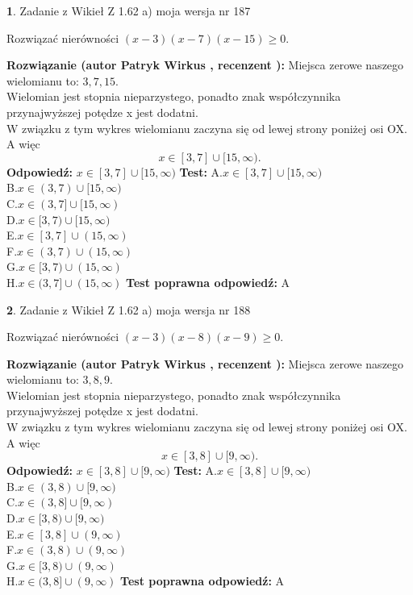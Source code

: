\documentclass[12pt, a4paper]{article}
\theoremstyle{definition} %
\newtheorem{zad}{}
\newcommand{\zadStart}[1]{\begin{zad}#1\newline}
\newcommand{\zadStop}{\end{zad}}
\newcommand{\rozwStart}[2]{\noindent \textbf{Rozwiązanie (autor #1 , recenzent #2): }\newline}
\newcommand{\rozwStop}{\newline}
\newcommand{\odpStart}{\noindent \textbf{Odpowiedź:}\newline}
\newcommand{\odpStop}{\newline}
\newcommand{\testStart}{\noindent \textbf{Test:}\newline}
\newcommand{\testStop}{\newline}
\newcommand{\kluczStart}{\noindent \textbf{Test poprawna odpowiedź:}\newline}
\newcommand{\kluczStop}{\newline}
\begin{document}
\zadStart{Zadanie z Wikieł Z 1.62 a) moja wersja nr 187}

Rozwiązać nierówności $(x-3)(x-7)(x-15)\ge0$.
\zadStop
\rozwStart{Patryk Wirkus}{}
Miejsca zerowe naszego wielomianu to: $3, 7, 15$.\\
Wielomian jest stopnia nieparzystego, ponadto znak współczynnika przy\linebreak najwyższej potędze x jest dodatni.\\ W związku z tym wykres wielomianu zaczyna się od lewej strony poniżej osi OX. A więc $$x \in [3,7] \cup [15,\infty).$$
\rozwStop
\odpStart
$x \in [3,7] \cup [15,\infty)$
\odpStop
\testStart
A.$x \in [3,7] \cup [15,\infty)$\\
B.$x \in (3,7) \cup [15,\infty)$\\
C.$x \in (3,7] \cup [15,\infty)$\\
D.$x \in [3,7) \cup [15,\infty)$\\
E.$x \in [3,7] \cup (15,\infty)$\\
F.$x \in (3,7) \cup (15,\infty)$\\
G.$x \in [3,7) \cup (15,\infty)$\\
H.$x \in (3,7] \cup (15,\infty)$
\testStop
\kluczStart
A
\kluczStop



\zadStart{Zadanie z Wikieł Z 1.62 a) moja wersja nr 188}

Rozwiązać nierówności $(x-3)(x-8)(x-9)\ge0$.
\zadStop
\rozwStart{Patryk Wirkus}{}
Miejsca zerowe naszego wielomianu to: $3, 8, 9$.\\
Wielomian jest stopnia nieparzystego, ponadto znak współczynnika przy\linebreak najwyższej potędze x jest dodatni.\\ W związku z tym wykres wielomianu zaczyna się od lewej strony poniżej osi OX. A więc $$x \in [3,8] \cup [9,\infty).$$
\rozwStop
\odpStart
$x \in [3,8] \cup [9,\infty)$
\odpStop
\testStart
A.$x \in [3,8] \cup [9,\infty)$\\
B.$x \in (3,8) \cup [9,\infty)$\\
C.$x \in (3,8] \cup [9,\infty)$\\
D.$x \in [3,8) \cup [9,\infty)$\\
E.$x \in [3,8] \cup (9,\infty)$\\
F.$x \in (3,8) \cup (9,\infty)$\\
G.$x \in [3,8) \cup (9,\infty)$\\
H.$x \in (3,8] \cup (9,\infty)$
\testStop
\kluczStart
A
\kluczStop
\end{document}

